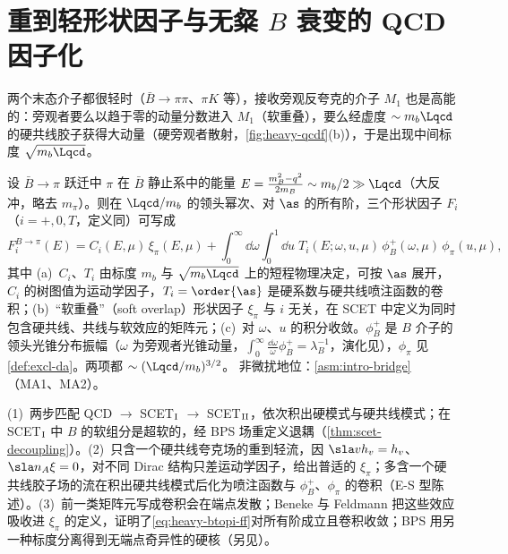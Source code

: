 \section{重到轻形状因子与无粲 $B$ 衰变的 QCD 因子化}\label{sec:heavy-qcdf}

两个末态介子都很轻时（$\bar B\to\pi\pi$、$\pi K$ 等），接收旁观反夸克的介子 $M_1$ 也是高能的：旁观者要么以趋于零的动量分数进入 $M_1$（软重叠），要么经虚度 $\sim m_b\Lqcd$ 的硬共线胶子获得大动量（硬旁观者散射，\cref{fig:heavy-qcdf}(b)），于是出现中间标度 $\sqrt{m_b\Lqcd}$。


\begin{proposition}\label{prop:heavy-btopi-ff}
设 $\bar B\to\pi$ 跃迁中 $\pi$ 在 $\bar B$ 静止系中的能量 $E=\frac{m_B^2-q^2}{2m_B}\sim m_b/2\gg\Lqcd$（大反冲，略去 $m_\pi$）。则在 $\Lqcd/m_b$ 的领头幂次、对 $\as$ 的所有阶，三个形状因子 $F_i$（$i=+,0,T$，定义同\cite{Beneke:2003pa}）可写成
\begin{equation}\label{eq:heavy-btopi-ff}
F_i^{B\to\pi}(E)=C_i(E,\mu)\,\xi_\pi(E,\mu)+\int_0^\infty\!\dd\omega\int_0^1\!\dd u\;T_i(E;\omega,u,\mu)\,\phi_B^+(\omega,\mu)\,\phi_\pi(u,\mu),
\end{equation}
其中 (a)~$C_i$、$T_i$ 由标度 $m_b$ 与 $\sqrt{m_b\Lqcd}$ 上的短程物理决定，可按 $\as$ 展开，$C_i$ 的树图值为运动学因子，$T_i=\order{\as}$ 是硬系数与硬共线喷注函数的卷积；(b)~“软重叠”（soft overlap）形状因子 $\xi_\pi$ 与 $i$ 无关，在 SCET 中定义为同时包含硬共线、共线与软效应的矩阵元；(c)~对 $\omega$、$u$ 的积分收敛。$\phi_B^+$ 是 $B$ 介子的领头光锥分布振幅（$\omega$ 为旁观者光锥动量，$\int_0^\infty\frac{\dd\omega}{\omega}\phi_B^+=\lambda_B^{-1}$\cite{Grozin:1996pq}，演化见\cite{Lange:2003ff}），$\phi_\pi$ 见\cref{def:excl-da}。两项都 $\sim(\Lqcd/m_b)^{3/2}$。
非微扰地位：\cref{asm:intro-bridge}（MA1、MA2）。
\end{proposition}

\begin{proofsketch}
(1)~两步匹配 QCD $\to$ SCET$_{\rm I}$ $\to$ SCET$_{\rm II}$，依次积出硬模式与硬共线模式；在 SCET$_{\rm I}$ 中 $B$ 的软组分是超软的，经 BPS 场重定义退耦（\cref{thm:scet-decoupling}）。(2)~只含一个硬共线夸克场的重到轻流，因 $\sla vh_v=h_v$、$\sla n_A\xi=0$，对不同 Dirac 结构只差运动学因子，给出普适的 $\xi_\pi$；多含一个硬共线胶子场的流在积出硬共线模式后化为喷注函数与 $\phi_B^+$、$\phi_\pi$ 的卷积（E-S 型陈述）。(3)~前一类矩阵元写成卷积会在端点发散；Beneke 与 Feldmann 把这些效应吸收进 $\xi_\pi$ 的定义，证明了\cref{eq:heavy-btopi-ff}对所有阶成立且卷积收敛\cite{Beneke:2003pa}；BPS 用另一种标度分离得到无端点奇异性的硬核\cite{Bauer:2002aj}（另见\cite{Hill:2002vw,Beneke:2005gs}）。
\end{proofsketch}

